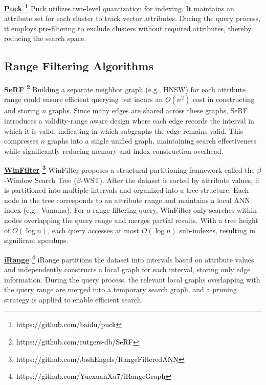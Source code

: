 \documentclass[sigconf, nonacm, pdfa]{acmart}
\begin{document}
{	
	
	
	\noindent\textbf{\underline{Puck} \footnote{\textcolor{black}{https://github.com/baidu/puck}}} \cite{puck}
	Puck utilizes two-level quantization for indexing. It maintains an attribute set for each cluster to track vector attributes. During the query process, it employs pre-filtering to exclude clusters without required attributes, thereby reducing the search space.

	
	
	
	\subsection{Range Filtering Algorithms}
	
	\noindent\textbf{\underline{SeRF} \footnote{\textcolor{black}{https://github.com/rutgers-db/SeRF}}} \cite{serf} 
	Building a separate neighbor graph (e.g., HNSW) for each attribute range could ensure efficient querying but incurs an $O(n^2)$ cost in constructing and storing $n$ graphs. Since many edges are shared across these graphs, SeRF introduces a validity-range aware design where each edge records the interval in which it is valid, indicating in which subgraphs the edge remains valid. This compresses $n$ graphs into a single unified graph, maintaining search effectiveness while significantly reducing memory and index construction overhead.
	
	\noindent\textbf{\underline{WinFilter} \footnote{\textcolor{black}{https://github.com/JoshEngels/RangeFilteredANN}}} \cite{winFilter}
	WinFilter proposes a structural partitioning framework called the $\beta$-Window Search Tree ($\beta$-WST). After the dataset is sorted by attribute values, it is partitioned into multiple intervals and organized into a tree structure. Each node in the tree corresponds to an attribute range and maintains a local ANN index (e.g., Vamana). For a range filtering query, WinFilter only searches within nodes overlapping the query range and merges partial results. With a tree height of $O(\log n)$, each query accesses at most $O(\log n)$ sub-indexes, resulting in significant speedups.
	
	\noindent\textbf{\underline{iRange} \footnote{\textcolor{black}{https://github.com/YuexuanXu7/iRangeGraph}}} \cite{iRangeGraph}
	iRange partitions the dataset into intervals based on attribute values and independently constructs a local graph for each interval, storing only edge information. During the query process, the relevant local graphs overlapping with the query range are merged into a temporary search graph, and a pruning strategy is applied to enable efficient search.
	
}
\end{document}
